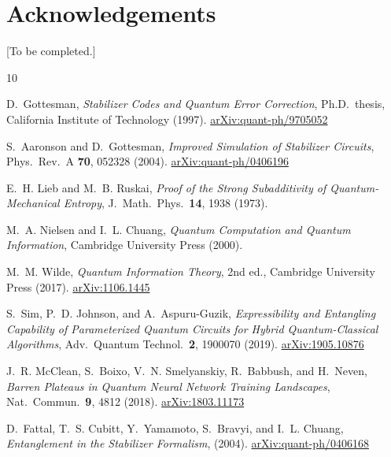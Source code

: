 \documentclass[11pt,a4paper]{article}
\begin{document}
\section*{Acknowledgements}

[To be completed.]

\begin{thebibliography}{10}

D.~Gottesman,
\textit{Stabilizer Codes and Quantum Error Correction},
Ph.D.\ thesis, California Institute of Technology (1997).
\href{https://arxiv.org/abs/quant-ph/9705052}{arXiv:quant-ph/9705052}

S.~Aaronson and D.~Gottesman,
\textit{Improved Simulation of Stabilizer Circuits},
Phys.\ Rev.\ A \textbf{70}, 052328 (2004).
\href{https://arxiv.org/abs/quant-ph/0406196}{arXiv:quant-ph/0406196}

E.~H. Lieb and M.~B. Ruskai,
\textit{Proof of the Strong Subadditivity of Quantum-Mechanical Entropy},
J.\ Math.\ Phys.\ \textbf{14}, 1938 (1973).

M.~A. Nielsen and I.~L. Chuang,
\textit{Quantum Computation and Quantum Information},
Cambridge University Press (2000).

M.~M. Wilde,
\textit{Quantum Information Theory}, 2nd ed.,
Cambridge University Press (2017).
\href{https://arxiv.org/abs/1106.1445}{arXiv:1106.1445}

S.~Sim, P.~D. Johnson, and A.~Aspuru-Guzik,
\textit{Expressibility and Entangling Capability of Parameterized Quantum
Circuits for Hybrid Quantum-Classical Algorithms},
Adv.\ Quantum Technol.\ \textbf{2}, 1900070 (2019).
\href{https://arxiv.org/abs/1905.10876}{arXiv:1905.10876}

J.~R. McClean, S.~Boixo, V.~N. Smelyanskiy, R.~Babbush, and H.~Neven,
\textit{Barren Plateaus in Quantum Neural Network Training Landscapes},
Nat.\ Commun.\ \textbf{9}, 4812 (2018).
\href{https://arxiv.org/abs/1803.11173}{arXiv:1803.11173}

\end{thebibliography}

D.~Fattal, T.~S. Cubitt, Y.~Yamamoto, S.~Bravyi, and I.~L. Chuang,
\textit{Entanglement in the Stabilizer Formalism},
(2004).
\href{https://arxiv.org/abs/quant-ph/0406168}{arXiv:quant-ph/0406168}
\end{document}
